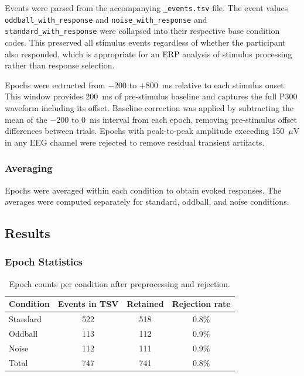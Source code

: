 \documentclass[11pt, a4paper, twocolumn]{article}
\begin{document}
Events were parsed from the accompanying \texttt{\_events.tsv} file. The
event values \texttt{oddball\_with\_response} and
\texttt{noise\_with\_response} and \texttt{standard\_with\_response} were
collapsed into their respective base condition codes. This preserved all
stimulus events regardless of whether the participant also responded, which
is appropriate for an ERP analysis of stimulus processing rather than
response selection.

Epochs were extracted from $-200$ to $+800$~ms relative to each stimulus
onset. This window provides 200~ms of pre-stimulus baseline and captures
the full P300 waveform including its offset. Baseline correction was
applied by subtracting the mean of the $-200$ to $0$~ms interval from
each epoch, removing pre-stimulus offset differences between trials.
Epochs with peak-to-peak amplitude exceeding 150~$\mu$V in any EEG channel
were rejected to remove residual transient artifacts.

\subsubsection{Averaging}

Epochs were averaged within each condition to obtain evoked responses.
The averages were computed separately for standard, oddball, and noise
conditions.

\subsection{Results}

\subsubsection{Epoch Statistics}

\begin{table}[htbp]
    \centering
    \caption{Epoch counts per condition after preprocessing and rejection.}
    \label{tab:epochs}
    \begin{tabular}{lccc}
        \toprule
        Condition & Events in TSV & Retained & Rejection rate \\
        \midrule
        Standard  & 522 & 518 & 0.8\% \\
        Oddball   & 113 & 112 & 0.9\% \\
        Noise     & 112 & 111 & 0.9\% \\
        \midrule
        Total     & 747 & 741 & 0.8\% \\
        \bottomrule
    \end{tabular}
\end{table}
\end{document}
